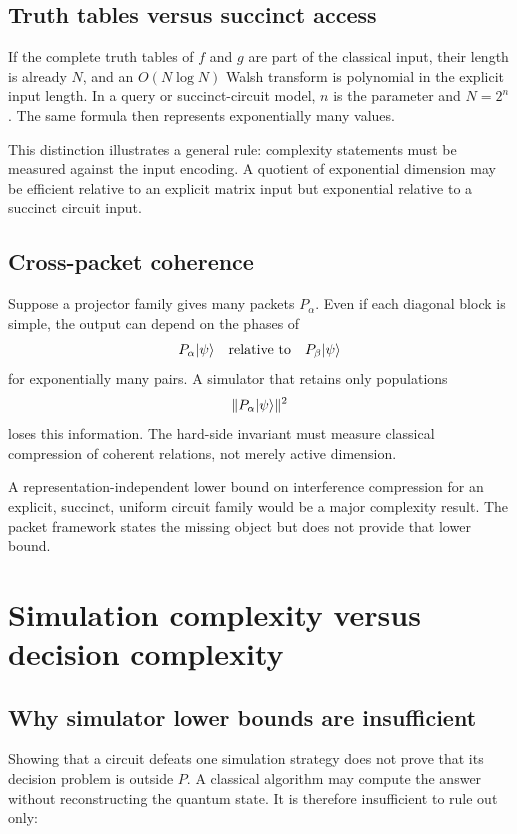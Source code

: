 \subsection{Truth tables versus succinct access}
If the complete truth tables of $f$ and $g$ are part of the classical input, their length is already $N$, and an $O(N\log N)$ Walsh transform is polynomial in the explicit input length. In a query or succinct-circuit model, $n$ is the parameter and $N=2^n$. The same formula then represents exponentially many values.

This distinction illustrates a general rule: complexity statements must be measured against the input encoding. A quotient of exponential dimension may be efficient relative to an explicit matrix input but exponential relative to a succinct circuit input.

\subsection{Cross-packet coherence}
Suppose a projector family gives many packets $P_\alpha$. Even if each diagonal block is simple, the output can depend on the phases of
\[
P_\alpha\lvert \psi\rangle
\quad\text{relative to}\quad
P_\beta\lvert \psi\rangle
\]
for exponentially many pairs. A simulator that retains only populations
\[
\|P_\alpha\lvert \psi\rangle\|^2
\]
loses this information. The hard-side invariant must measure classical compression of coherent relations, not merely active dimension.

\begin{frontierbox}
A representation-independent lower bound on interference compression for an explicit, succinct, uniform circuit family would be a major complexity result. The packet framework states the missing object but does not provide that lower bound.
\end{frontierbox}

\section{Simulation complexity versus decision complexity}
\label{s:ch:decision-complexity}

\subsection{Why simulator lower bounds are insufficient}
Showing that a circuit defeats one simulation strategy does not prove that its decision problem is outside $P$. A classical algorithm may compute the answer without reconstructing the quantum state. It is therefore insufficient to rule out only:

